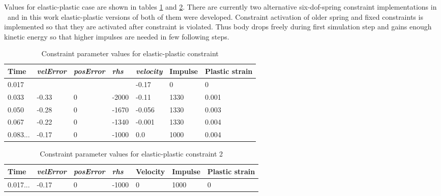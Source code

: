 Values for elastic-plastic case are shown in tables \ref{tab:epBlockValues} and 
 \ref{tab:ep2BlockValues}. 
There are currently two alternative six-dof-spring constraint implementations in \bullet\ and 
in this work elastic-plastic versions of both of them were developed. 
Constraint activation of older spring and fixed constraints is implemented so that 
they are activated after constraint is violated.
Thus body drops freely during first simulation step and 
gains enough kinetic energy so that higher impulses are needed in few following steps.

\begin {table}[htb!]
\begin{center}
\begin{tabular}{|l| l| l|l|l|l|l|}
\hline
{\bf Time} & 
{\it velError} & {\it posError} & {\it rhs} &
{\it velocity} & 
{\bf Impulse} & 
{\bf Plastic strain} \\  \hline
0.017 &          &    &          & -0.17 & 0 & 0 \\  \hline
0.033 &  -0.33 & 0 & -2000 & -0.11 &  1330 & 0.001 \\  \hline
0.050 &  -0.28 & 0 & -1670 & -0.056 &  1330 & 0.003 \\  \hline
0.067 &  -0.22 & 0 & -1340 &  -0.001&  1330 & 0.004\\  \hline
0.083... &  -0.17 & 0 & -1000 &  0.0&  1000 & 0.004\\  \hline
\end {tabular}
\end{center}
\caption {Constraint parameter values for elastic-plastic constraint} \label{tab:epBlockValues} 
\end {table}

\begin {table}[htb!]
\begin{center}
\begin{tabular}{|l| l| l|l|l|l|l|}
\hline
{\bf Time} & 
{\it velError} & {\it posError} & {\it rhs} &
{\bf Velocity} & 
{\bf Impulse} & 
{\bf Plastic strain} \\  \hline
0.017... & -0.17  & 0 & -1000 & 0       & 1000 & 0 \\  \hline
\end {tabular}
\end{center}
\caption {Constraint parameter values for elastic-plastic constraint 2} \label{tab:ep2BlockValues} 
\end {table}


